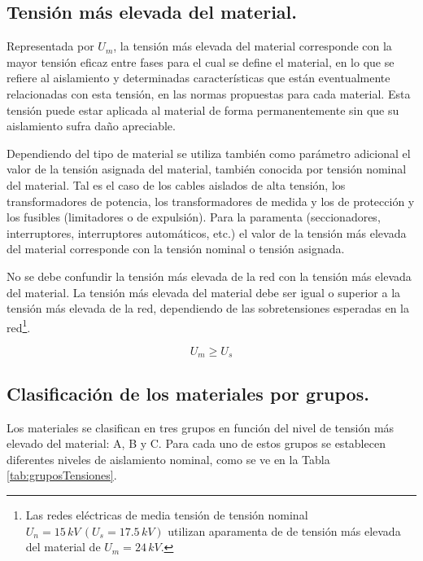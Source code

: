         \subsection{Tensión más elevada del material.}
            Representada por $U_\textit{m}$, la tensión más elevada del material corresponde con la mayor tensión eficaz entre fases para el cual se define el material, en lo que se refiere al aislamiento y determinadas características que están eventualmente relacionadas con esta tensión, en las normas propuestas para cada material. Esta tensión puede estar aplicada al material de forma permanentemente sin que su aislamiento sufra daño apreciable.\newline
            
            Dependiendo del tipo de material se utiliza también como parámetro adicional el valor de la tensión asignada del material, también conocida por tensión nominal del material. Tal es el caso de los cables aislados de alta tensión, los transformadores de potencia, los transformadores de medida y los de protección y los fusibles (limitadores o de expulsión). Para la paramenta (seccionadores, interruptores, interruptores automáticos, etc.) el valor de la tensión más elevada del material corresponde con la tensión nominal o tensión asignada.\newline
            
            No se debe confundir la tensión más elevada de la red con la tensión más elevada del material. La tensión más elevada del material debe ser igual o superior a la tensión más elevada de la red, dependiendo de las sobretensiones esperadas en la red\footnote{Las redes eléctricas de media tensión de tensión nominal $U_\textit{n} = 15\,\textit{kV}\,(U_\textit{s} = 17.5\,\textit{kV})$ utilizan aparamenta de de tensión más elevada del material de $U_\textit{m} = 24\,\textit{kV}$.}.
            
            \begin{equation}
                U_\textit{m} \geq U_\textit{s}
            \end{equation}

        \subsection{Clasificación de los materiales por grupos.}
        Los materiales se clasifican en tres grupos en función del nivel de tensión más elevado del material: A, B y C. Para cada uno de estos grupos se establecen diferentes niveles de aislamiento nominal, como se ve en la Tabla \ref{tab:gruposTensiones}.\newline

